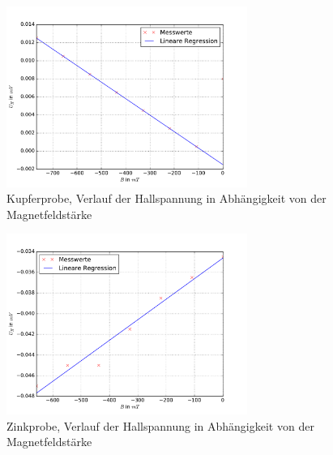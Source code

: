 
\begin{figure}
  \centering
  \includegraphics[width=0.7\textwidth]{pics/u_h_kupfer_konstI.pdf}
  \caption{Kupferprobe, Verlauf der Hallspannung in Abhängigkeit von der Magnetfeldstärke}
  \label{fig: uh_konstI_kupfer}
\end{figure}
\begin{figure}
  \centering
  \includegraphics[width=0.7\textwidth]{pics/u_h_zink_konstI.pdf}
  \caption{Zinkprobe, Verlauf der Hallspannung in Abhängigkeit von der Magnetfeldstärke}
  \label{fig: uh_konstI_zink}
\end{figure}


